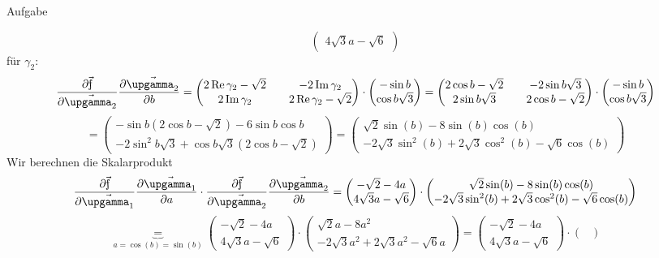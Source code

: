 \documentclass{scrartcl}
\begin{document}
\begin{section}{Aufgabe}
\begin{itemize}
\[\begin{pmatrix}
    4\sqrt{3}a-\sqrt{6}
\end{pmatrix}\]
für \(\gamma_2\):
\[\pfb=
\begin{pmatrix}
    2\Re \gamma_2 -\sqrt{2}&& -2\Im \gamma_2\\
    2\Im \gamma_2&& 2\Re \gamma_2 -\sqrt{2}
\end{pmatrix}
\cdot\begin{pmatrix}-\sin{b}\\\cos{b}\sqrt{3}\end{pmatrix}
=
\begin{pmatrix}
    2\cos{b} -\sqrt{2}&& -2\sin{b}\sqrt{3}\\
    2\sin{b}\sqrt{3}&& 2\cos{b} -\sqrt{2}
\end{pmatrix}
\cdot\begin{pmatrix}-\sin{b}\\\cos{b}\sqrt{3}\end{pmatrix}
\]
\[=\begin{pmatrix}
    -\sin{b}(2\cos{b}-\sqrt{2})-6\sin{b}\cos{b}\\
    -2\sin^2{b}\sqrt{3}+\cos{b}\sqrt{3}(2\cos{b}-\sqrt{2})
\end{pmatrix}
=\begin{pmatrix}
    \sqrt{2} \sin (b)-8 \sin (b) \cos (b)  \\
    -2 \sqrt{3} \sin ^2(b)+2 \sqrt{3} \cos ^2(b)-\sqrt{6} \cos (b)
\end{pmatrix}\]
Wir berechnen die Skalarprodukt \[\pfa\cdot\pfb=\begin{pmatrix}
    -\sqrt{2}-4a\\
    4\sqrt{3}a-\sqrt{6}
\end{pmatrix}\cdot\begin{pmatrix}
    \sqrt{2} \sin (b)-8 \sin (b) \cos (b)  \\
    -2 \sqrt{3} \sin ^2(b)+2 \sqrt{3} \cos ^2(b)-\sqrt{6} \cos (b)
\end{pmatrix}
\]\[\underbrace{=}_{a=\cos(b)=\sin(b)}
\begin{pmatrix}
    -\sqrt{2}-4a\\
    4\sqrt{3}a-\sqrt{6}
\end{pmatrix}\cdot\begin{pmatrix}
    \sqrt{2} a-8 a^2  \\
    -2 \sqrt{3} a^2+2 \sqrt{3} a^2-\sqrt{6} a
\end{pmatrix}=
\begin{pmatrix}
    -\sqrt{2}-4a\\
    4\sqrt{3}a-\sqrt{6}
\end{pmatrix}\cdot\begin{pmatrix}

\end{pmatrix}\]
\end{itemize}
\end{section}
\end{document}
